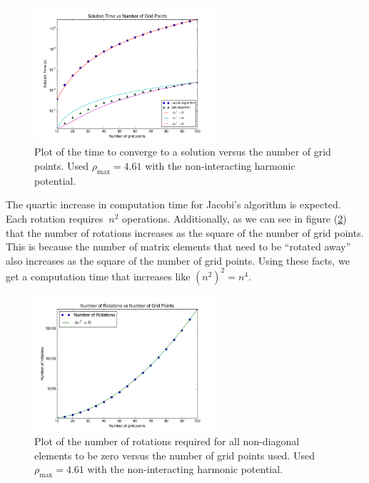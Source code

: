 \documentclass[a4paper,12pt]{report}
\begin{document}
\begin{figure}
\centering
 \includegraphics[width=0.6\textwidth]{SeHoTimeTest.png}
 \caption{Plot of the time to converge to a solution versus the number of grid points. Used $\rho_{\mathrm{max}} = 4.61$ with the non-interacting harmonic potential.}
 \label{fig:sehotime}
\end{figure}

The quartic increase in computation time for Jacobi's algorithm is expected. Each rotation requires $~n^2$ operations. Additionally, as we can see in figure (\ref{fig:sehoiter}) that the number of rotations increases as the square of the number of grid points. This is because the number of matrix elements that need to be ``rotated away'' also increases as the square of the number of grid points. Using these facts, we get a computation time that increases like $(n^2)^2 = n^4$.

\begin{figure}
\centering
 \includegraphics[width=0.6\textwidth]{SeHoIterTest.png}
 \caption{Plot of the number of rotations required for all non-diagonal elements to be zero versus the number of grid points used. Used $\rho_{\mathrm{max}} = 4.61$ with the non-interacting harmonic potential.}
 \label{fig:sehoiter}
\end{figure}
\end{document}
